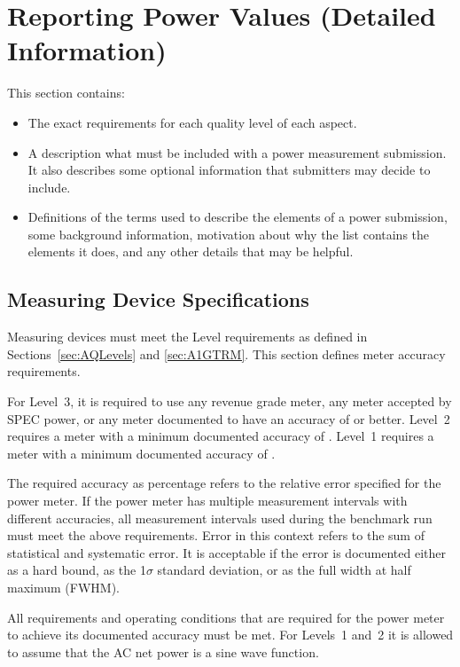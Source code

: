 \chapter{Reporting Power Values \normalsize{(Detailed Information)}}
\label{sec:reporting}

\noindent
This section contains:
\begin{itemize}
 \item The exact requirements for each quality level of each aspect.
 \item A description what must be included with a power measurement submission.
       It also describes some optional information that submitters may decide to include.
 \item Definitions of the terms used to describe the elements of a power submission, some background information, motivation about why the list contains the elements it does, and any other details that may be helpful.
\end{itemize}
\wl

\section{Measuring Device Specifications}
\label{sec:MDSpecs}
\noindent
Measuring devices must meet the Level requirements as defined in 
Sections~\ref{sec:AQLevels} and \ref{sec:A1GTRM}.
This section defines meter accuracy requirements.
\wl

\noindent
For Level~3, it is required to use any revenue grade meter, any meter accepted by SPEC power, or any meter documented to have an accuracy of \SpecAccuracyLThree{} or better.
Level~2 requires a meter with a minimum documented accuracy of \SpecAccuracyLTwo{}.
Level~1 requires a meter with a minimum documented accuracy of \SpecAccuracyLOne{}.
\wl

\noindent
The required accuracy as percentage refers to the relative error specified for the power meter.
If the power meter has multiple measurement intervals with different accuracies, all measurement intervals used during the benchmark run must meet the above requirements.
Error in this context refers to the sum of statistical and systematic error.
It is acceptable if the error is documented either as a hard bound, as the 1$\sigma$ standard deviation, or as the full width at half maximum (FWHM).
\wl

\noindent
All requirements and operating conditions that are required for the power meter to achieve its documented accuracy must be met.
For Levels~1 and~2 it is allowed to assume that the AC net power is a sine wave function.
\wl

